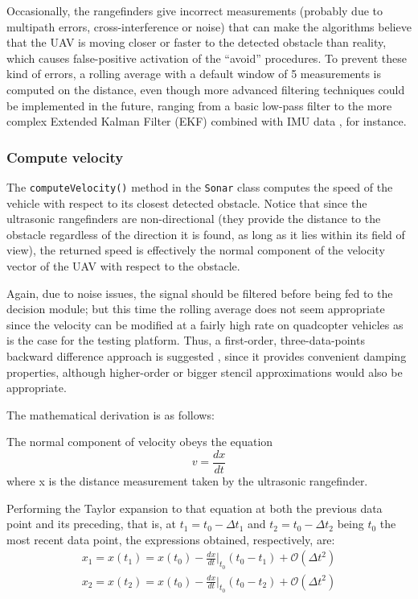 Occasionally, the rangefinders give incorrect measurements (probably due to multipath errors, cross-interference or noise) that can make the algorithms believe that the UAV is moving closer or faster to the detected obstacle than reality, which causes false-positive activation of the ``avoid'' procedures.
To prevent these kind of errors, a rolling average with a default window of 5 measurements is computed on the distance, even though more advanced filtering techniques could be implemented in the future, ranging from a basic low-pass filter to the more complex Extended Kalman Filter (EKF) combined with IMU data \cite{sasiadek2000}, for instance. 

\subsubsection{Compute velocity} \label{sec:velocity}

The \texttt{computeVelocity()} method in the \texttt{Sonar} class computes the speed of the vehicle with respect to its closest detected obstacle.
Notice that since the ultrasonic rangefinders are non-directional (they provide the distance to the obstacle regardless of the direction it is found, as long as it lies within its field of view), the returned speed is effectively the normal component of the velocity vector of the UAV with respect to the obstacle.

Again, due to noise issues, the signal should be filtered before being fed to the decision module; but this time the rolling average does not seem appropriate since the velocity can be modified at a fairly high rate on quadcopter vehicles as is the case for the testing platform.
Thus, a first-order, three-data-points backward difference approach is suggested \cite{asselin1972}, since it provides convenient damping properties, although higher-order or bigger stencil approximations would also be appropriate.

The mathematical derivation is as follows:

The normal component of velocity obeys the equation
\begin{equation}
	v=\frac{d x}{d t}
	\label{eq:v}
\end{equation}
where x is the distance measurement taken by the ultrasonic rangefinder.

Performing the Taylor expansion to that equation at both the previous data point and its preceding, that is, at $t_1=t_0-\Delta t_1$ and $t_2=t_0-\Delta t_2$ being $t_0$ the most recent data point, the expressions obtained, respectively, are:
\begin{eqnarray}
	x_1=x\left(t_1\right)=x\left(t_0\right) 
		- \frac{dx}{dt} \Bigg\rvert_{t_0} \left(t_0-t_1\right) 
		+ \mathcal{O}\left(\Delta t^2\right)	\\
	x_2=x\left(t_2\right)=x\left(t_0\right)
		- \frac{dx}{dt} \Bigg\rvert_{t_0} \left(t_0-t_2\right) 
		+ \mathcal{O}\left(\Delta t^2\right)
	\label{eq:taylor}
\end{eqnarray}

